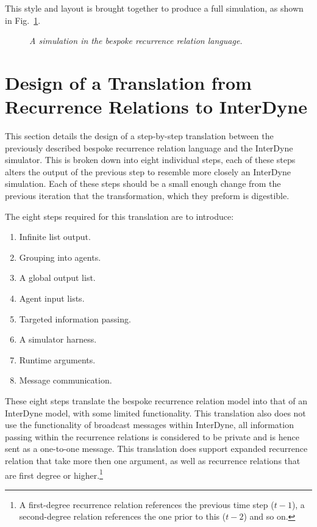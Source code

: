 \documentclass{article}
\begin{document}
This style and layout is brought together to produce a full simulation, as shown in Fig.~\ref{fig:8exofla}.
\begin{figure}[H]
	\centering
	
	\caption{\it A simulation in the bespoke recurrence relation language.}
	\label{fig:8exofla}
\end{figure} 







\section{Design of a Translation from Recurrence Relations to InterDyne} 
This section details the design of a step-by-step translation between the previously described bespoke recurrence relation language and the InterDyne simulator. This is broken down into eight individual steps, each of these steps alters the output of the previous step to resemble more closely an InterDyne simulation. Each of these steps should be a small enough change from the previous iteration that the transformation, which they preform is digestible. 

The eight steps required for this translation are to introduce:
\begin{enumerate}
  \item Infinite list output.
  \item Grouping into agents.
  \item A global output list.
  \item Agent input lists.
  \item Targeted information passing.
  \item A simulator harness.
  \item Runtime arguments.
  \item Message communication.
\end{enumerate} 
These eight steps translate the bespoke recurrence relation model into that of an InterDyne model, with some limited functionality. This translation also does not use the functionality of broadcast messages within InterDyne, all information passing within the recurrence relations is considered to be private and is hence sent as a one-to-one message. This translation does support expanded recurrence relation that take more then one argument, as well as recurrence relations that are first degree or higher.\footnote{A first-degree recurrence relation references the previous time step ($t-1$), a second-degree relation references the one prior to this ($t-2$) and so on.}  
\end{document}
